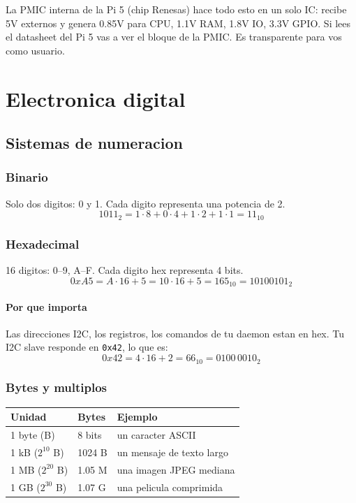 \documentclass[11pt,a4paper,oneside,openright]{book}
\begin{document}
\begin{payload}
La PMIC interna de la Pi 5 (chip Renesas) hace todo esto en un solo IC:
recibe 5V externos y genera 0.85V para CPU, 1.1V RAM, 1.8V IO, 3.3V GPIO.
Si lees el datasheet del Pi 5 vas a ver el bloque de la PMIC. Es transparente
para vos como usuario.
\end{payload}

\part{Electronica digital}

\chapter{Sistemas de numeracion}

\section{Binario}

Solo dos digitos: 0 y 1. Cada digito representa una potencia de 2.
\[
1011_2 = 1\cdot 8 + 0\cdot 4 + 1\cdot 2 + 1\cdot 1 = 11_{10}
\]

\section{Hexadecimal}

16 digitos: 0--9, A--F. Cada digito hex representa 4 bits.
\[
0xA5 = A\cdot 16 + 5 = 10\cdot 16 + 5 = 165_{10} = 10100101_2
\]

\subsection{Por que importa}

Las direcciones I2C, los registros, los comandos de tu daemon estan en hex.
Tu I2C slave responde en \texttt{0x42}, lo que es:
\[
0x42 = 4 \cdot 16 + 2 = 66_{10} = 0100\,0010_2
\]

\section{Bytes y multiplos}

\begin{center}
\begin{tabular}{lll}
\toprule
\textbf{Unidad} & \textbf{Bytes} & \textbf{Ejemplo} \\
\midrule
1 byte (B)         & 8 bits       & un caracter ASCII \\
1 kB ($2^{10}$ B)  & 1024 B        & un mensaje de texto largo \\
1 MB ($2^{20}$ B)  & 1.05 M        & una imagen JPEG mediana \\
1 GB ($2^{30}$ B)  & 1.07 G        & una pelicula comprimida \\
\bottomrule
\end{tabular}
\end{center}
\end{document}

